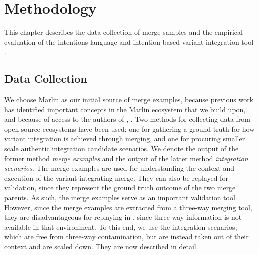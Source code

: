 \chapter{Methodology}
This chapter describes the data collection of merge samples and the empirical evaluation of the intentions language and intention-based variant integration tool \tooln.

\section{Data Collection}
We choose Marlin as our initial source of merge examples, because previous work has identified important concepts in the Marlin ecosystem that we build upon, and because of access to the authors of \cite{stanciulescu2015}, \cite{stanciulescu2016concepts}. Two methods for collecting data from open-source ecosystems have been used: one for gathering a ground truth for how variant integration is achieved through merging, and one for procuring smaller scale authentic integration candidate scenarios. We denote the output of the former method \textit{merge examples} and the output of the latter method \textit{integration scenarios}. The merge examples are used for understanding the context and execution of the variant-integrating merge. They can also be replayed for validation, since they represent the ground truth outcome of the two merge parents. As such, the merge examples serve as an important validation tool. However, since the merge examples are extracted from a three-way merging tool, they are disadvantageous for replaying in \tooln, since three-way information is not available in that environment. To this end, we use the integration scenarios, which are free from three-way contamination, but are instead taken out of their context and are scaled down. They are now described in detail.

